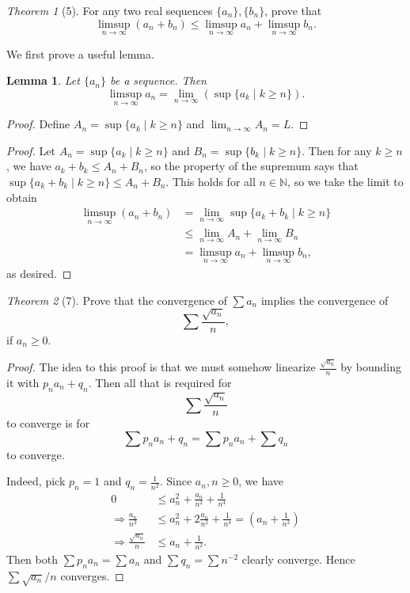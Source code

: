 \documentclass[12pt]{article}
\newtheorem*{lemma}{Lemma}
\theoremstyle{remark}
\theoremstyle{named}
\newtheorem*{theorem}{Theorem}
\renewcommand{\implies}{\Rightarrow}
\begin{document}
\begin{theorem}[5]
    For any two real sequences \(\{a_n\}, \{b_n\}\), prove that 
    \[\limsup_{n \to \infty} (a_n + b_n) \le \limsup_{n \to \infty} a_n + \limsup_{n \to \infty} b_n.\]
\end{theorem}

We first prove a useful lemma.

\begin{lemma}
    Let \(\{a_n\}\) be a sequence. Then \[\limsup_{n \to \infty} a_n = \lim_{n \to \infty} (\sup \{a_k \mid k \ge n\}).\]
\end{lemma}

\begin{proof}
    Define \(A_n = \sup \{a_k \mid k \ge n\}\) and \(\lim_{n \to \infty} A_n = L\). 
\end{proof}

\begin{proof}
    Let \(A_n = \sup \{a_k \mid k \ge n\}\) and \(B_n = \sup \{b_k \mid k \ge n\}\). Then for any \(k \ge n\), we have \(a_k + b_k \le A_n + B_n\), so the property of the supremum says that \(\sup \{a_k + b_k \mid k \ge n\} \le A_n + B_n\). This holds for all \(n \in \mathbb N\), so we take the limit to obtain
    \begin{align*}
        \limsup_{n \to \infty} (a_n + b_n) &= \lim_{n \to \infty} \sup \{a_k + b_k \mid k \ge n\} \\
        &\le \lim_{n \to \infty} A_n + \lim_{n \to \infty} B_n \\
        &= \limsup_{n \to \infty} a_n + \limsup_{n \to \infty} b_n,
    \end{align*}
    as desired.
\end{proof}

\begin{theorem}[7]
    Prove that the convergence of \(\sum a_n\) implies the convergence of 
    \[\sum \frac{\sqrt{a_n}}{n},\]
    if \(a_n \ge 0\).
\end{theorem}

\begin{proof}
    The idea to this proof is that we must somehow linearize \(\frac{\sqrt{a_n}}{n}\) by bounding it with \(p_n a_n + q_n\). Then all that is required for \[\sum \frac{\sqrt{a_n}}{n}\] to converge is for 
    \[\sum p_n a_n + q_n = \sum p_n a_n + \sum q_n\] to converge. 

    Indeed, pick \(p_n = 1\) and \(q_n = \frac{1}{n^2}\). Since \(a_n, n \ge 0\), we have 
    \begin{align*}
        0 &\le a_n^2 + \frac{a_n}{n^2} + \frac{1}{n^4} \\
        \implies \frac{a_n}{n^2} &\le a_n^2 + 2\frac{a_n}{n^2} + \frac{1}{n^4} = \left(a_n + \frac{1}{n^2}\right) \\
        \implies \frac{\sqrt{a_n}}{n} &\le a_n + \frac{1}{n^2}.
    \end{align*}
    Then both \(\sum p_n a_n = \sum a_n\) and \(\sum q_n = \sum n^{-2}\) clearly converge. Hence \(\sum \sqrt{a_n}/n\) converges.
\end{proof}
\end{document}
